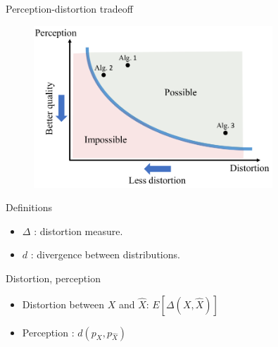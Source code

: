 \documentclass[xcolor=pdftex,dvipsnames,table,mathserif]{beamer}
\begin{document}
\begin{frame}{Perception-distortion tradeoff~\cite{blau_perception-distortion_2018}}

\begin{figure}[ht]
  \centering
  \includegraphics[width=0.8\textwidth]{impossible}
\end{figure}


\end{frame}

\begin{frame}{Definitions}

\begin{itemize}[<+->]
\item $\Delta$ : distortion measure.
\item $d$ : divergence between distributions.
\end{itemize}

\pause

\begin{block}{Distortion, perception}
\begin{itemize}[<+->]
\item Distortion between $X$ and $\hat{X}$: $E[\Delta(X, \hat{X})]$
  \item Perception : $d(p_X, p_{\hat{X}})$
\end{itemize}

\end{block}



\end{frame}
\end{document}
